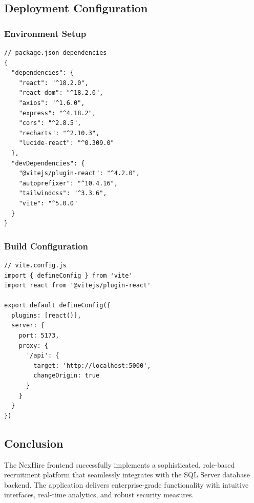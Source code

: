 \documentclass[11pt,a4paper]{article}
\begin{document}
\subsection{Deployment Configuration}

\subsubsection*{Environment Setup}
\begin{verbatim}
// package.json dependencies
{
  "dependencies": {
    "react": "^18.2.0",
    "react-dom": "^18.2.0",
    "axios": "^1.6.0",
    "express": "^4.18.2",
    "cors": "^2.8.5",
    "recharts": "^2.10.3",
    "lucide-react": "^0.309.0"
  },
  "devDependencies": {
    "@vitejs/plugin-react": "^4.2.0",
    "autoprefixer": "^10.4.16",
    "tailwindcss": "^3.3.6",
    "vite": "^5.0.0"
  }
}
\end{verbatim}

\subsubsection*{Build Configuration}
\begin{verbatim}
// vite.config.js
import { defineConfig } from 'vite'
import react from '@vitejs/plugin-react'

export default defineConfig({
  plugins: [react()],
  server: {
    port: 5173,
    proxy: {
      '/api': {
        target: 'http://localhost:5000',
        changeOrigin: true
      }
    }
  }
})
\end{verbatim}


\subsection{Conclusion}


    The NexHire frontend successfully implements a sophisticated, role-based recruitment platform that seamlessly integrates with the SQL Server database backend. The application delivers enterprise-grade functionality with intuitive interfaces, real-time analytics, and robust security measures.
\end{document}
